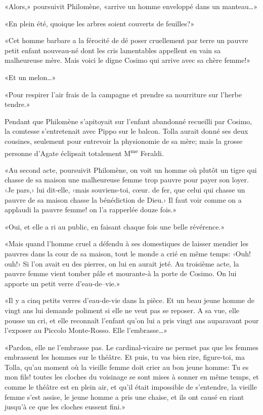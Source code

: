 «Alors,» poursuivit Philomène, «arrive un homme enveloppé dans un
manteau\ldots»

«En plein été, quoique les arbres soient couverts de feuilles?»

«Cet homme barbare a la férocité de dé poser cruellement par terre un
pauvre petit enfant nouveau-né dont les cris lamentables appellent en
vain sa malheureuse mère. Mais voici le digne Cosimo qui arrive avec sa
chère femme!»

«Et un melon\ldots»

«Pour respirer l'air frais de la campagne et prendre sa nourriture sur
l'herbe tendre.»

Pendant que Philomène s'apitoyait sur l'enfant abandonné recueilli par
Cosimo, la comtesse s'entretenait avec Pippo sur le balcon. Tolla aurait
donné ses deux cousines, seulement pour entrevoir la physionomie de sa
mère; mais la grosse personne d'Agate éclipsait totalement
M\textsuperscript{me} Feraldi.

«Au second acte, poursuivit Philomène, on voit un homme où plutôt un
tigre qui chasse de sa maison une malheureuse femme trop pauvre pour
payer son loyer. ‹Je pars,› lui dit-elle, ‹mais souviens-toi, cœur. de
fer, que celui qui chasse un pauvre de sa maison chasse la bénédiction
de Dieu.› Il faut voir comme on a applaudi la pauvre femme! on l'a
rapperlée douze fois.»

«Oui, et elle a ri au public, en faisant chaque fois une belle
révérence.»

«Mais quand l'homme cruel a défendu à ses domestiques de laisser mendier
les pauvres dans la cour de sa maison, tout le monde a crié en même
temps: ‹Ouh! ouh!› Si l'on avait eu des pierres, on lui en aurait jeté.
Au troisième acte, la pauvre femme vient tomber pâle et mourante-à la
porte de Cosimo. On lui apporte un petit verre d'eau-de--vie.»

«Il y a cinq petits verres d'eau-de-vie dans la pièce. Et un beau jeune
homme de vingt ans lui demande poliment si elle ne veut pas se reposer.
A sa vue, elle pousse un cri, et elle reconnaît l'enfant qu'on lui a
pris vingt ans auparavant pour l'exposer au Piccolo Monte-Rosso. Elle
l'embrasse\ldots»

«Pardon, elle ne l'embrasse pas. Le cardinal-vicaire ne permet pas que
les femmes embrassent les hommes sur le théâtre. Et puis, tu vas bien
rire, figure-toi, ma Tolla, qu'au moment où la vieille femme doit crier
au bon jeune homme: Tu es mon fils! toutes les cloches du voisinage se
sont mises à sonner en même temps, et comme le théâtre est en plein air,
et qu'il était impossible de s'entendre, la vieille femme s'est assise,
le jeune homme a pris une chaise, et ils ont causé en riant jusqu'à ce
que les cloches eussent fini.»

